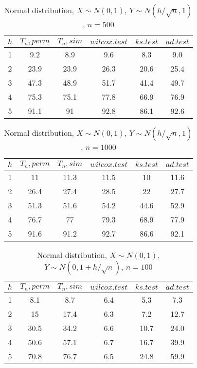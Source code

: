 \documentclass{svproc}
\begin{document}
\begin{table}
  \caption{Normal distribution, $X\sim N(0,1)$, $Y\sim N(h/\sqrt{n},1)$, $n=500$}
  \begin{center}
  \begin{tabular}{c@{\quad}c@{\quad}c@{\quad}c@{\quad}c@{\quad}c}
  \hline
  $h$ & $T_n, perm$ & $T_n, sim$ & $wilcox.test$ & $ks.test$ & $ad.test$ \\
  \hline
  1 & 9.2 & 8.9 & 9.6 & 8.3 & 9.0 \\
  2 & 23.9 & 23.9 & 26.3 & 20.6 & 25.4 \\
  3 & 47.3 & 48.9 & 51.7 & 41.4 & 49.7 \\
  4 & 75.3 & 75.1 & 77.8 & 66.9 & 76.9 \\
  5 & 91.1 & 91 & 92.8 & 86.1 & 92.6 \\
  \hline
  \end{tabular}
  \end{center}
\end{table}

\begin{table}
  \caption{Normal distribution, $X\sim N(0,1)$, $Y\sim N(h/\sqrt{n},1)$, $n=1000$}
  \begin{center}
  \begin{tabular}{c@{\quad}c@{\quad}c@{\quad}c@{\quad}c@{\quad}c}
  \hline
  $h$  & $T_n, perm$ & $T_n, sim$ & $wilcox.test$ & $ks.test$ & $ad.test$ \\
  \hline
  1 & 11 & 11.3 & 11.5 & 10 & 11.6 \\
  2 & 26.4 & 27.4 & 28.5 & 22 & 27.7 \\
  3 & 51.3 & 51.6 & 54.2 & 44.6 & 52.9 \\
  4 & 76.7 & 77 & 79.3 & 68.9 & 77.9 \\
  5 & 91.6 & 91.2 & 92.7 & 86.6 & 92.1 \\
  \hline
  \end{tabular}
  \end{center}
\end{table}

\begin{table}
  \caption{Normal distribution, $X\sim N(0,1)$, $Y\sim N(0, 1 + h/\sqrt{n})$, $n=100$}
  \begin{center}
  \begin{tabular}{c@{\quad}c@{\quad}c@{\quad}c@{\quad}c@{\quad}c}
  \hline
  $h$ & $T_n, perm$ & $T_n, sim$ & $wilcox.test$ & $ks.test$ & $ad.test$ \\
  \hline
  1 & 8.1 & 8.7 & 6.4 & 5.3 & 7.3 \\
  2 & 15 & 17.4 & 6.3 & 7.2 & 12.7 \\
  3 & 30.5 & 34.2 & 6.6 & 10.7 & 24.0 \\
  4 & 50.6 & 57.1 & 6.7 & 16.7 & 39.9 \\
  5 & 70.8 & 76.7 & 6.5 & 24.8 & 59.9 \\
  \hline
  \end{tabular}
  \end{center}
\end{table}
\end{document}
